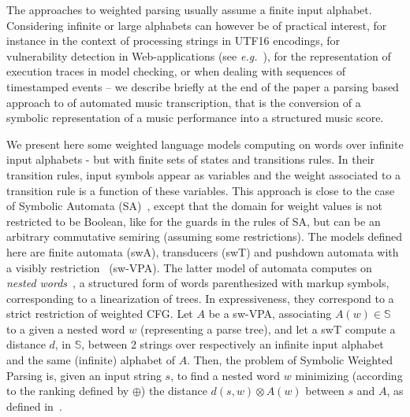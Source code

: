\documentclass[runningheads]{llncs}
\def\eg{\textit{e.g.}\xspace}
\newcommand{\Semiring}{\mathbb{S}}
\def\SWT{\textsf{swT}\xspace}
\def\SWA{\textsf{swA}\xspace}
\def\SWVPA{\textsf{sw-VPA}\xspace}
\begin{document}
The approaches to weighted parsing usually assume a finite input alphabet. %
Considering infinite or large alphabets can however be of practical interest, 
for instance in the context of processing strings in UTF16 encodings, 
for vulnerability detection in Web-applications 
(see \eg~\cite{dAntoni21CACM}), 
for the representation of execution traces in model checking, 
or when dealing with sequences of timestamped events
-- we describe briefly at the end of the paper a parsing based approach to 
of automated music transcription, that is the conversion of a symbolic 
representation of a music performance into a structured music score.



We present here some weighted language models
computing on words over infinite input alphabets %
- but with finite sets of states and transitions rules. 
In their transition rules, input symbols appear as variables %
and the weight associated to a transition rule is a function of these variables.
% 
This approach is close to the case of 
Symbolic Automata (SA)~\cite{dAntoniVeanes17CAV,dAntoni21CACM}, 
except that the domain for weight values is not restricted to be Boolean, 
like for the guards in the rules of SA, 
but can be an arbitrary commutative semiring (assuming some restrictions).
%
The models defined here are finite automata (\SWA),
transducers (\SWT) and pushdown automata
with a visibly restriction~\cite{AlurMadhusudan09nested} (\SWVPA).
The latter model of automata computes on \emph{nested words}~\cite{AlurMadhusudan09nested}, 
a structured form of words parenthesized with markup symbols, 
corresponding to a linearization of trees.
In expressiveness, they correspond to a strict restriction
of weighted CFG. 
Let $A$ be a \SWVPA, associating $A(w) \in \Semiring$ 
to a given a nested word $w$ (representing a parse tree),
and let a \SWT compute a distance $d$, in $\Semiring$, 
between 2 strings over respectively an infinite input alphabet and the 
same (infinite) alphabet of $A$.
Then, the problem of Symbolic Weighted Parsing is, 
given an input string $s$, to find a nested word $w$ minimizing 
(according to the ranking defined by $\oplus$)
the distance $d(s, w) \otimes A(w)$ between $s$ and $A$, 
as defined in~\cite{Mohri03EDWA}.
\end{document}
